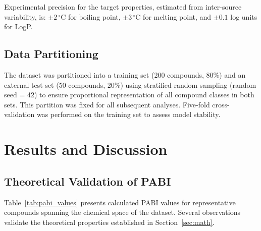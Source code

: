 \documentclass[12pt,a4paper]{article}
\begin{document}
Experimental precision for the target properties, estimated from inter-source variability, is: $\pm 2\,^{\circ}\text{C}$ for boiling point, $\pm 3\,^{\circ}\text{C}$ for melting point, and $\pm 0.1$ log units for LogP.

\subsection{Data Partitioning}

The dataset was partitioned into a training set (200 compounds, 80\%) and an external test set (50 compounds, 20\%) using stratified random sampling (random seed = 42) to ensure proportional representation of all compound classes in both sets. This partition was fixed for all subsequent analyses. Five-fold cross-validation was performed on the training set to assess model stability.

\section{Results and Discussion}
\label{sec:results}

\subsection{Theoretical Validation of PABI}

Table~\ref{tab:pabi_values} presents calculated PABI values for representative compounds spanning the chemical space of the dataset. Several observations validate the theoretical properties established in Section~\ref{sec:math}.
\end{document}
